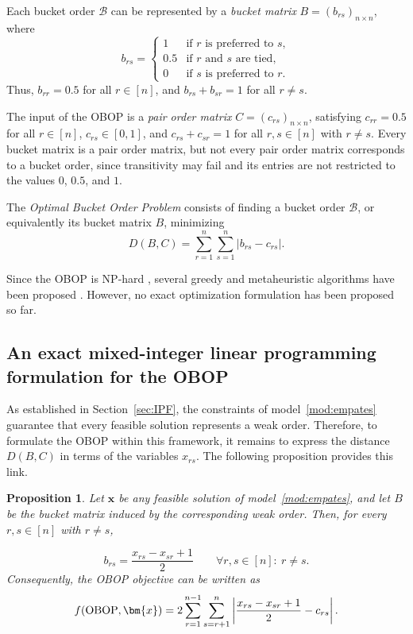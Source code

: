 \documentclass[pdflatex,basic,Numbered]{jnl}%
\theoremstyle{plain}
\newtheorem{prop}{Proposition}
\theoremstyle{remark}
\theoremstyle{thmstyleone}%
\theoremstyle{thmstylethree}%
\begin{document}
Each bucket order \(\mathcal{B}\) can be represented by a \emph{bucket matrix} \(B=(b_{rs})_{n\times n}\), where
\[
b_{rs}=
\begin{cases}
1 & \text{if } r \text{ is preferred to } s,\\
0.5 & \text{if } r \text{ and } s \text{ are tied},\\
0 & \text{if } s \text{ is preferred to } r.
\end{cases}
\]
Thus, \(b_{rr}=0.5\) for all \(r\in[n]\), and \(b_{rs}+b_{sr}=1\) for all \(r\neq s\).

The input of the OBOP is a \emph{pair order matrix} \(C=(c_{rs})_{n\times n}\), satisfying \(c_{rr}=0.5\) for all \(r\in[n]\),  \(c_{rs}\in[0,1]\), and \(c_{rs}+c_{sr}=1\) for all \(r,s\in[n]\) with \(r\neq s\). Every bucket matrix is a pair order matrix, but not every pair order matrix corresponds to a bucket order, since transitivity may fail and its entries are not restricted to the values \(0\), \(0.5\), and \(1\).

The \emph{Optimal Bucket Order Problem} \citep{gionis2006algorithms,ukkonen2009randomized} consists of finding a bucket order \(\mathcal{B}\), or equivalently its bucket matrix \(B\), minimizing
\[
D(B,C)=
\sum_{r=1}^{n}
\sum_{s=1}^{n}
|b_{rs}-c_{rs}|.
\]

Since the OBOP is NP-hard \citep{gionis2006algorithms}, several greedy and metaheuristic algorithms have been proposed \citep{ukkonen2009randomized,kenkre2011discovering,aledo2017utopia,aledo2018approaching,d2019median,aledo2021highly}. However, no exact optimization formulation has been proposed so far.

\subsection{An exact mixed-integer linear programming formulation for the {\rm OBOP}} \label{sec:ILP_OBOP}

As established in Section~\ref{sec:IPF}, the constraints of model~\eqref{mod:empates} guarantee that every feasible solution represents a weak order. Therefore, to formulate the OBOP within this framework, it remains to express the distance \(D(B,C)\) in terms of the variables \(x_{rs}\). The following proposition provides this link.

\begin{prop}
Let \(\bm{x}\) be any feasible solution of model~\eqref{mod:empates}, and let \(B\) be the bucket matrix induced by the corresponding weak order. Then, for every \(r,s\in[n]\) with \(r\neq s\),

\[
b_{rs}=
\frac{x_{rs}-x_{sr}+1}{2}
\qquad
\forall r,s\in[n]:\ r\neq s.
\]
Consequently, the {\rm OBOP} objective can be written as
\begin{equation}\label{eq:objetivo_valor_absoluto_red}
f({\rm OBOP},\bm{x}) =
2\sum_{r=1}^{n-1}\sum_{s=r+1}^{n}
\left|
\frac{x_{rs}-x_{sr}+1}{2}
-c_{rs}
\right|.
\end{equation}
\end{prop}
\end{document}
